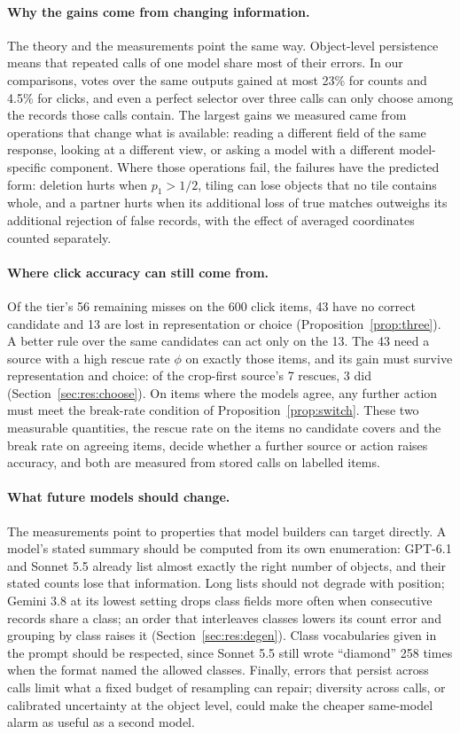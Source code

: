 \paragraph{Why the gains come from changing information.} The theory and the measurements point the same way. Object-level persistence means that repeated calls of one model share most of their errors. In our comparisons, votes over the same outputs gained at most 23\% for counts and 4.5\% for clicks, and even a perfect selector over three calls can only choose among the records those calls contain. The largest gains we measured came from operations that change what is available: reading a different field of the same response, looking at a different view, or asking a model with a different model-specific component. Where those operations fail, the failures have the predicted form: deletion hurts when $p_1>1/2$, tiling can lose objects that no tile contains whole, and a partner hurts when its additional loss of true matches outweighs its additional rejection of false records, with the effect of averaged coordinates counted separately.

\paragraph{Where click accuracy can still come from.} Of the tier's 56 remaining misses on the 600 click items, 43 have no correct candidate and 13 are lost in representation or choice (Proposition~\ref{prop:three}). A better rule over the same candidates can act only on the 13. The 43 need a source with a high rescue rate $\phi$ on exactly those items, and its gain must survive representation and choice: of the crop-first source's 7 rescues, 3 did (Section~\ref{sec:res:choose}). On items where the models agree, any further action must meet the break-rate condition of Proposition~\ref{prop:switch}. These two measurable quantities, the rescue rate on the items no candidate covers and the break rate on agreeing items, decide whether a further source or action raises accuracy, and both are measured from stored calls on labelled items.

\paragraph{What future models should change.} The measurements point to properties that model builders can target directly. A model's stated summary should be computed from its own enumeration: GPT-6.1 and Sonnet 5.5 already list almost exactly the right number of objects, and their stated counts lose that information. Long lists should not degrade with position; Gemini 3.8 at its lowest setting drops class fields more often when consecutive records share a class; an order that interleaves classes lowers its count error and grouping by class raises it (Section~\ref{sec:res:degen}). Class vocabularies given in the prompt should be respected, since Sonnet 5.5 still wrote ``diamond'' 258 times when the format named the allowed classes. Finally, errors that persist across calls limit what a fixed budget of resampling can repair; diversity across calls, or calibrated uncertainty at the object level, could make the cheaper same-model alarm as useful as a second model.

